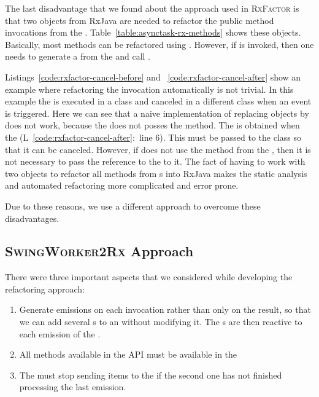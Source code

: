 \documentclass[type=bsc,accentcolor=tud9c]{tudthesis}
\newcommand{\framework}[1]{\textcolor{black!65}{#1}}
\newcommand{\toolextension}{\textsc{SwingWorker2Rx}}
\begin{document}
The last disadvantage that we found about the approach used in \textsc{RxFactor} is that two objects from \framework{RxJava} are needed to refactor the public method invocations from the . Table~\ref{table:asynctask-rx-methods} shows these objects. Basically, most methods can be refactored using . However, if  is invoked, then one needs to generate a  from the  and call .



Listings~\ref{code:rxfactor-cancel-before} and ~\ref{code:rxfactor-cancel-after} show an example where refactoring the  invocation automatically is not trivial. In this example the  is executed in a class and canceled in a different class when an event is triggered. Here we can see that a naive implementation of replacing  objects by  does not work, because the  does not posses the  method. The  is obtained when the  (L~\ref{code:rxfactor-cancel-after}:~line 6). This  must be passed to the class  so that it can be canceled. However, if  does not use the  method from the , then it is not necessary to pass the reference to the  to it. The fact of having to work with two objects to refactor all methods from s into \framework{RxJava} makes the static analysis and automated refactoring more complicated and error prone.



Due to these reasons, we use a different approach to overcome these disadvantages.
\newpage

\subsection{\toolextension{} Approach}
There were three important aspects that we considered while developing the refactoring approach:
\begin{enumerate}
	\item Generate emissions on each  invocation rather than only on the result, so that we can add several s to an  without modifying it. The s are then reactive to each emission of the .
	\item All methods available in the  API must be available in the 
	\item The  must stop sending items to the  if the second one has not finished processing the last emission.
\end{enumerate}
\end{document}

